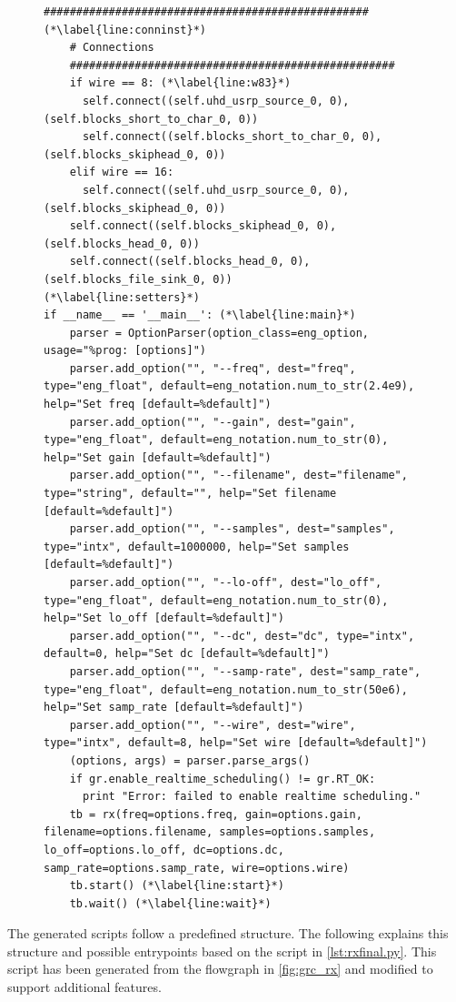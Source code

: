 \documentclass[12pt,a4paper,parskip=full,abstracton]{scrartcl}
\begin{document}
\begin{figure}[htbp]
\begin{lstlisting}[basicstyle=\tiny,caption={Generated RX flowgraph module with modifications ({\ttfamily rx\_final.py)}},label=lst:rxfinal.py]
    ################################################## (*\label{line:conninst}*)
    # Connections
    ##################################################
    if wire == 8: (*\label{line:w83}*)
      self.connect((self.uhd_usrp_source_0, 0), (self.blocks_short_to_char_0, 0))
      self.connect((self.blocks_short_to_char_0, 0), (self.blocks_skiphead_0, 0))
    elif wire == 16:
      self.connect((self.uhd_usrp_source_0, 0), (self.blocks_skiphead_0, 0))
    self.connect((self.blocks_skiphead_0, 0), (self.blocks_head_0, 0))
    self.connect((self.blocks_head_0, 0), (self.blocks_file_sink_0, 0))
(*\label{line:setters}*)
if __name__ == '__main__': (*\label{line:main}*)
    parser = OptionParser(option_class=eng_option, usage="%prog: [options]")
    parser.add_option("", "--freq", dest="freq", type="eng_float", default=eng_notation.num_to_str(2.4e9), help="Set freq [default=%default]")
    parser.add_option("", "--gain", dest="gain", type="eng_float", default=eng_notation.num_to_str(0), help="Set gain [default=%default]")
    parser.add_option("", "--filename", dest="filename", type="string", default="", help="Set filename [default=%default]")
    parser.add_option("", "--samples", dest="samples", type="intx", default=1000000, help="Set samples [default=%default]")
    parser.add_option("", "--lo-off", dest="lo_off", type="eng_float", default=eng_notation.num_to_str(0), help="Set lo_off [default=%default]")
    parser.add_option("", "--dc", dest="dc", type="intx", default=0, help="Set dc [default=%default]")
    parser.add_option("", "--samp-rate", dest="samp_rate", type="eng_float", default=eng_notation.num_to_str(50e6), help="Set samp_rate [default=%default]")
    parser.add_option("", "--wire", dest="wire", type="intx", default=8, help="Set wire [default=%default]")
    (options, args) = parser.parse_args()
    if gr.enable_realtime_scheduling() != gr.RT_OK:
      print "Error: failed to enable realtime scheduling."
    tb = rx(freq=options.freq, gain=options.gain, filename=options.filename, samples=options.samples, lo_off=options.lo_off, dc=options.dc, samp_rate=options.samp_rate, wire=options.wire)
    tb.start() (*\label{line:start}*)
    tb.wait() (*\label{line:wait}*)
    \end{lstlisting}
\end{figure}
The generated scripts follow a predefined structure. The following explains
this structure and possible entrypoints based on the script in
\cref{lst:rxfinal.py}. This script has been generated from the flowgraph
in \cref{fig:grc_rx} and modified to support additional features.
\end{document}
